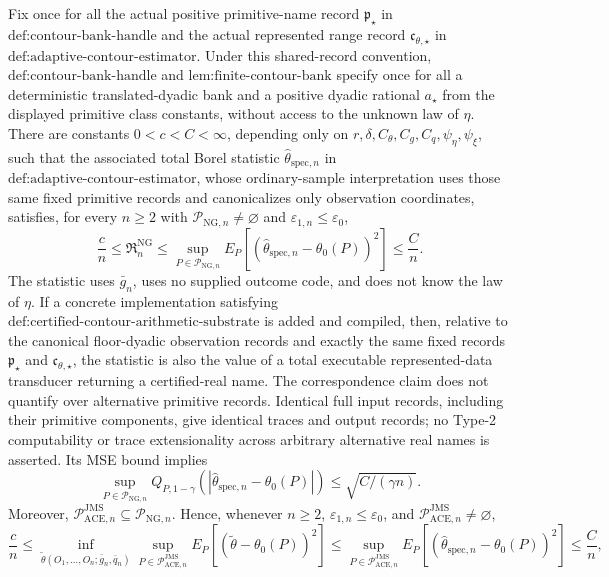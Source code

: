 Fix once for all the actual positive primitive-name record \(\mathfrak p_{\star}\) in \(\text{def:contour-bank-handle}\) and the actual represented range record \(\mathfrak c_{\theta,\star}\) in \(\text{def:adaptive-contour-estimator}\). Under this shared-record convention, \(\text{def:contour-bank-handle}\) and \(\text{lem:finite-contour-bank}\) specify once for all a deterministic translated-dyadic bank and a positive dyadic rational \(a_{\star}\) from the displayed primitive class constants, without access to the unknown law of \(\eta\). There are constants \(0<c<C<\infty\), depending only on \(r,\delta,C_{\theta},C_g,C_q,\psi_{\eta},\psi_{\xi}\), such that the associated total Borel statistic \(\widehat\theta_{\mathrm{spec},n}\) in \(\text{def:adaptive-contour-estimator}\), whose ordinary-sample interpretation uses those same fixed primitive records and canonicalizes only observation coordinates, satisfies, for every \(n\ge2\) with \(\mathcal P_{\mathrm{NG},n}\neq\varnothing\) and \(\varepsilon_{1,n}\le\varepsilon_0\),
\[
 \frac cn\le\mathfrak R_n^{\mathrm{NG}}
 \le\sup_{P\in\mathcal P_{\mathrm{NG},n}}
 E_P[(\widehat\theta_{\mathrm{spec},n}-\theta_0(P))^2]
 \le\frac Cn.
\]
The statistic uses \(\bar g_n\), uses no supplied outcome code, and does not know the law of \(\eta\). If a concrete implementation satisfying \(\text{def:certified-contour-arithmetic-substrate}\) is added and compiled, then, relative to the canonical floor-dyadic observation records and exactly the same fixed records \(\mathfrak p_{\star}\) and \(\mathfrak c_{\theta,\star}\), the statistic is also the value of a total executable represented-data transducer returning a certified-real name. The correspondence claim does not quantify over alternative primitive records. Identical full input records, including their primitive components, give identical traces and output records; no Type-2 computability or trace extensionality across arbitrary alternative real names is asserted. Its MSE bound implies
\[
 \sup_{P\in\mathcal P_{\mathrm{NG},n}}
 Q_{P,1-\gamma}(|\widehat\theta_{\mathrm{spec},n}-\theta_0(P)|)
 \le\sqrt{C/(\gamma n)}.
\]
Moreover, \(\mathcal P_{\mathrm{ACE},n}^{\mathrm{JMS}}\subseteq\mathcal P_{\mathrm{NG},n}\). Hence, whenever \(n\ge2\), \(\varepsilon_{1,n}\le\varepsilon_0\), and \(\mathcal P_{\mathrm{ACE},n}^{\mathrm{JMS}}\neq\varnothing\),
\[
 \frac cn
 \le
 \inf_{\widetilde\theta(O_1,\ldots,O_n;\bar g_n,\bar q_n)}
 \sup_{P\in\mathcal P_{\mathrm{ACE},n}^{\mathrm{JMS}}}
 E_P[(\widetilde\theta-\theta_0(P))^2]
 \le
 \sup_{P\in\mathcal P_{\mathrm{ACE},n}^{\mathrm{JMS}}}
 E_P[(\widehat\theta_{\mathrm{spec},n}-\theta_0(P))^2]
 \le\frac Cn,
\]
